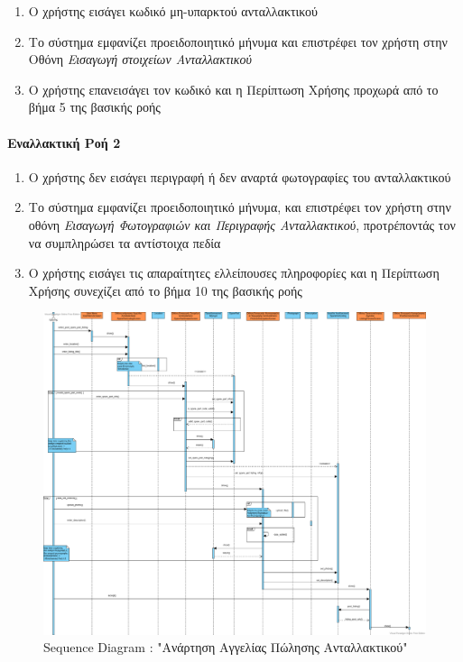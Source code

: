 \documentclass{../ol-softwaremanual}
\begin{document}
	\begin{enumerate}
		\item Ο χρήστης εισάγει κωδικό μη-υπαρκτού ανταλλακτικού
		\item Το σύστημα εμφανίζει προειδοποιητικό μήνυμα και επιστρέφει τον χρήστη στην Οθόνη \textit{Εισαγωγή στοιχείων Ανταλλακτικού}
		\item Ο χρήστης επανεισάγει τον κωδικό και η Περίπτωση Χρήσης προχωρά από το βήμα 5 της βασικής ροής
	\end{enumerate}
	
	\paragraph{Εναλλακτική Ροή 2}
	
	\begin{enumerate}
		\item Ο χρήστης δεν εισάγει περιγραφή ή δεν αναρτά φωτογραφίες του ανταλλακτικού
		\item Το σύστημα εμφανίζει προειδοποιητικό μήνυμα, και επιστρέφει τον χρήστη στην οθόνη \textit{Εισαγωγή Φωτογραφιών και Περιγραφής Ανταλλακτικού}, προτρέποντάς τον να συμπληρώσει τα αντίστοιχα πεδία
		\item Ο χρήστης εισάγει τις απαραίτητες ελλείπουσες πληροφορίες και η Περίπτωση Χρήσης συνεχίζει από το βήμα 10 της βασικής ροής
	\end{enumerate}
	
	\begin{figure}[htbp!]
		\centering
		\includegraphics[scale=0.23]{img/seq_spare_part_listing.png}
		\caption{\en Sequence Diagram : "\gr Ανάρτηση Αγγελίας Πώλησης Ανταλλακτικού\en"\gr}
	\end{figure}
	
\end{document}
